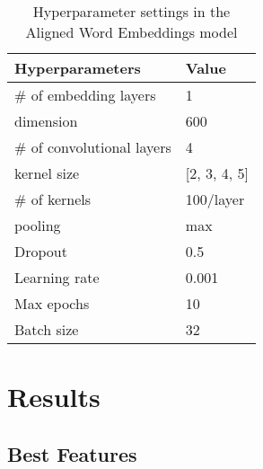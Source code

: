 \documentclass[11pt,a4paper]{article}
\begin{document}
\begin{table}[t]
  \begin{center}
  \begin{tabular}{|l|l|}
  \hline \bf Hyperparameters & \bf Value \\ \hline
  \# of embedding layers & 1 \\
  \hspace{0.5cm} dimension & 600 \\
  \# of convolutional layers & 4 \\
  \hspace{0.5cm} kernel size & [2, 3, 4, 5] \\
  \hspace{0.5cm} \# of kernels & 100/layer \\
  \hspace{0.5cm} pooling & max \\
  Dropout & 0.5 \\
  Learning rate & 0.001 \\
  Max epochs & 10 \\
  Batch size & 32 \\
  \hline
  \end{tabular}
  \end{center}
  \caption{\label{tab:cnn-hyperparams-table} Hyperparameter settings in the Aligned Word Embeddings model}
\end{table}

\section{Results}

\subsection{Best Features}
\end{document}

